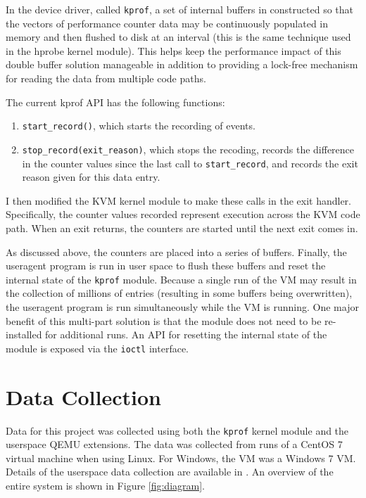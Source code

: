 \documentclass[notitlepage]{article}
\begin{document}
In the device driver, called \texttt{kprof}, a set of internal buffers in
constructed so that the vectors of performance counter data may be continuously
populated in memory and then flushed to disk at an interval (this is the same
technique used in the hprobe kernel module).  This helps keep the performance
impact of this double buffer solution manageable in addition to providing a
lock-free mechanism for reading the data from multiple code paths.

The current kprof API has the following functions:
\begin{enumerate}
    \item{\texttt{start\_record()}, which starts the recording of events.}
    \item{\texttt{stop\_record(exit\_reason)}, which stops the recoding, records
        the difference in the counter values since the last call to
    \texttt{start\_record}, and records the exit reason given for this data
entry.}
\end{enumerate}

I then modified the KVM kernel module to make these calls in the exit handler.
Specifically, the counter values recorded represent execution across the KVM
code path. When an exit returns, the counters are started until the next exit
comes in.

As discussed above, the counters are placed into a series of buffers. Finally,
the useragent program is run in user space to flush these buffers and reset the
internal state of the \texttt{kprof} module. Because a single run of the VM may
result in the collection of millions of entries (resulting in some buffers being
overwritten), the useragent program is run simultaneously while the VM is
running. One major benefit of this multi-part solution is that the module does
not need to be re-installed for additional runs. An API for resetting the
internal state of the module is exposed via the \texttt{ioctl} interface.


\section{Data Collection}
\label{sec:data}
Data for this project was collected using both the \texttt{kprof} kernel module
and the userspace QEMU extensions. The data was collected from runs of a CentOS
7 virtual machine when using Linux. For Windows, the VM was a Windows 7 VM.
Details of the userspace data collection are available in \cite{f14}. An
overview of the entire system is shown in Figure \ref{fig:diagram}.
\end{document}
